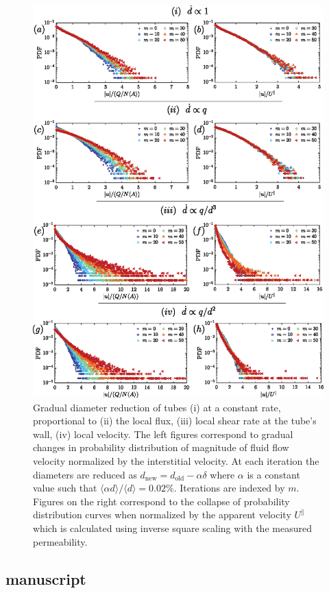 \begin{figure}[h]
 \centerline{\includegraphics[width=.9\textwidth]{./Figs/pdf_combined_final.eps}}
\caption{Gradual diameter reduction of tubes (i) at a constant rate, proportional to (ii) the local flux, (iii) local shear rate at the tube's wall, (iv) local velocity. The left figures correspond to gradual changes in probability distribution of magnitude of fluid flow velocity normalized by the interstitial velocity. At each iteration the diameters are reduced as $d_\text{new} = d_\text{old}-\alpha \delta$ where $\alpha$ is a constant value such that $\langle \alpha d \rangle/\langle d\rangle = 0.02\%$. Iterations are indexed by $m$. Figures on the right correspond to the collapse of probability distribution curves when normalized by the apparent velocity $U^\parallel$ which is calculated using inverse square scaling with the measured permeability.}
\label{sup-fig4}
\end{figure}

\subsection{manuscript} 

